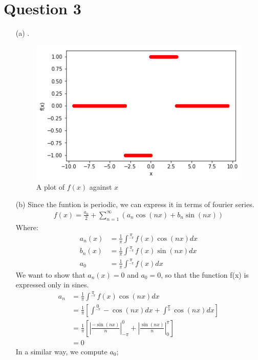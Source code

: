 \documentclass[12pt,a4paper]{article}
\begin{document}
\section*{Question 3}
\begin{itemize}
	\item [(a)]
	.\\
	\begin{figure}[h!]
		\centering
		\includegraphics[scale=0.6]{1.png}
		\caption{A plot of $f(x)$ against $x$ }
	\end{figure}
	\item[(b)] Since the funtion is periodic, we can express it in terms of  fourier series.
	\begin{align}
	f(x)=\frac{a_{0}}{2}+ \sum^{\infty}_{n=1}(a_{n} \cos(nx)+ b_{n}\sin(nx)) \label{11}
	\end{align}
		Where:
		\begin{align*}
		a_{n}(x)&=\frac{1}{\pi}\int^{\pi}\limits_{-\pi}f(x)\cos(nx)dx\\
		b_{n}(x)&=\frac{1}{\pi}\int^{\pi}\limits_{-\pi}f(x)\sin(nx)dx\\
		a_{0}&=\frac{1}{\pi}\int^{\pi}\limits_{-\pi}f(x)dx
		\end{align*}
		We want to show that $a_{n}(x)=0$ and $a_{0}=0$, so that the function f(x) is expressed only in sines.\\
		\begin{align*}
			a_{n}&=\frac{1}{\pi}\int^{\pi}\limits_{-\pi}f(x)\cos(nx)dx\\
			&=\frac{1}{\pi}[\int^{0}\limits_{-\pi}-\cos(nx)dx+\int^{\pi}\limits_{0}\cos(nx)dx ]\\
			&=\frac{1}{\pi}[|\frac{-\sin (nx)}{n}|^{0}_{-\pi}+|\frac{\sin (nx)}{n}|^{\pi}_{0} ]\\
			&=0
		\end{align*}
	In a similar way, we compute $a_{0}$;
	\begin{align*}

\end{align*}
\end{itemize}
\end{document}

